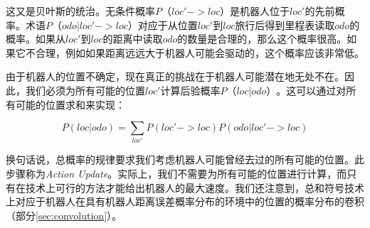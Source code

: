 
这又是贝叶斯的统治。无条件概率$P（loc'->loc）$是机器人位于$loc'$的先前概率。术语$P（odo|loc'->loc）$对应于从位置$loc'$到$loc$旅行后得到里程表读取$odo$的概率。如果从$loc'$到$loc$的距离中读取$odo$的数量是合理的，那么这个概率很高。如果它不合理，例如如果距离远远大于机器人可能会驱动的，这个概率应该非常低。

由于机器人的位置不确定，现在真正的挑战在于机器人可能潜在地无处不在。因此，我们必须为所有可能的位置$loc'$计算后验概率$P（loc|odo）$。这可以通过对所有可能的位置求和来实现：


\begin{equation}
P(loc|odo)=\sum_{loc'}P(loc'->loc)P(odo|loc'->loc)
\end{equation}


换句话说，总概率的规律要求我们考虑机器人可能曾经去过的所有可能的位置。此步骤称为\emph{Action Update}。实际上，我们不需要为所有可能的位置进行计算，而只有在技术上可行的方法才能给出机器人的最大速度。我们还注意到，总和符号技术上对应于机器人在具有机器人距离误差概率分布的环境中的位置的概率分布的卷积（部分\ref{sec:convolution}）。


